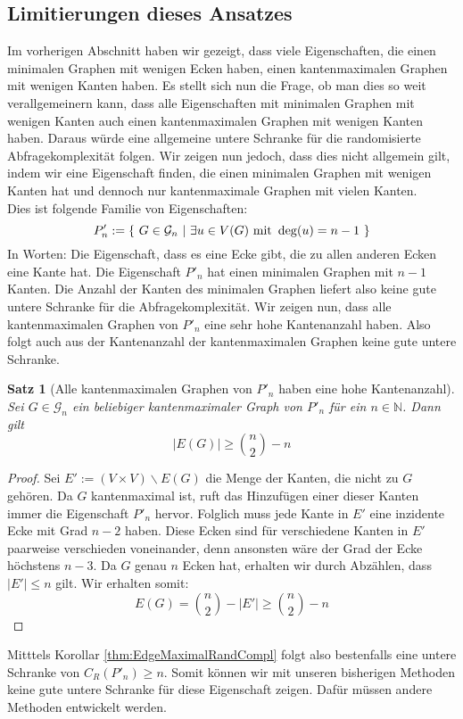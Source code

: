 \documentclass[a4paper]{scrreprt}
\newtheorem{Satz}[definition]{Satz}
\theoremstyle{definition}
\begin{document}
\subsection{Limitierungen dieses Ansatzes}
Im vorherigen Abschnitt haben wir gezeigt, dass viele Eigenschaften,
die einen  minimalen Graphen mit wenigen Ecken haben, einen kantenmaximalen
Graphen mit wenigen Kanten haben. Es stellt sich nun die Frage,
ob man dies so weit verallgemeinern kann, dass alle Eigenschaften
mit minimalen Graphen mit wenigen Kanten auch einen kantenmaximalen
Graphen mit wenigen Kanten haben. Daraus würde eine allgemeine
untere Schranke für die randomisierte Abfragekomplexität folgen.
Wir zeigen nun jedoch, dass dies nicht allgemein gilt, indem wir
eine Eigenschaft finden, die einen minimalen Graphen mit wenigen
Kanten hat und dennoch nur kantenmaximale Graphen mit vielen Kanten. \\
Dies ist folgende Familie von Eigenschaften:
$$ P'_n := \{ \ G \in \mathcal{G}_n \ 
| \ \exists u\in V(G) \textup{ mit } \deg(u) = n-1 \ \}$$
In Worten: Die Eigenschaft, dass es eine Ecke gibt,
die zu allen anderen Ecken eine Kante hat.
Die Eigenschaft $P'_n$ hat einen minimalen Graphen mit
$n-1$ Kanten. Die Anzahl der Kanten des minimalen Graphen
liefert also keine gute untere Schranke für die Abfragekomplexität.
Wir zeigen nun, dass alle kantenmaximalen Graphen von $P'_n$
eine sehr hohe Kantenanzahl haben. Also folgt auch aus der Kantenanzahl
der kantenmaximalen Graphen keine gute untere Schranke.
\begin{Satz}[Alle kantenmaximalen Graphen von $P'_n$ 
             haben eine hohe Kantenanzahl]
Sei $G\in \mathcal{G}_n$ ein beliebiger kantenmaximaler Graph
von $P'_n$ für ein $n\in \mathbb{N}$. Dann gilt
$$ |E(G)| \geq \binom{n}{2} - n $$
\end{Satz}
\begin{proof}
Sei $E' := (V \times V) \backslash E(G)$ die Menge der Kanten, die nicht
zu $G$ gehören. Da $G$ kantenmaximal ist, ruft das Hinzufügen
einer dieser Kanten immer die Eigenschaft $P'_n$ hervor.
Folglich muss jede Kante in $E'$ eine inzidente Ecke mit Grad
$n-2$ haben. Diese Ecken sind für verschiedene Kanten in $E'$
paarweise verschieden voneinander, denn ansonsten wäre der
Grad der Ecke höchstens $n-3$. Da $G$ genau $n$ Ecken hat,
erhalten wir durch Abzählen, dass $|E'| \leq n$ gilt.
Wir erhalten somit:
$$ E(G) = \binom{n}{2} - |E'| \geq \binom{n}{2} - n $$
\end{proof}

Mitttels Korollar \ref{thm:EdgeMaximalRandCompl} folgt also bestenfalls
eine untere Schranke von $C_R(P'_n) \geq n$. Somit können
wir mit unseren bisherigen Methoden keine gute untere Schranke
für diese Eigenschaft zeigen. Dafür müssen andere Methoden
entwickelt werden.
\end{document}
